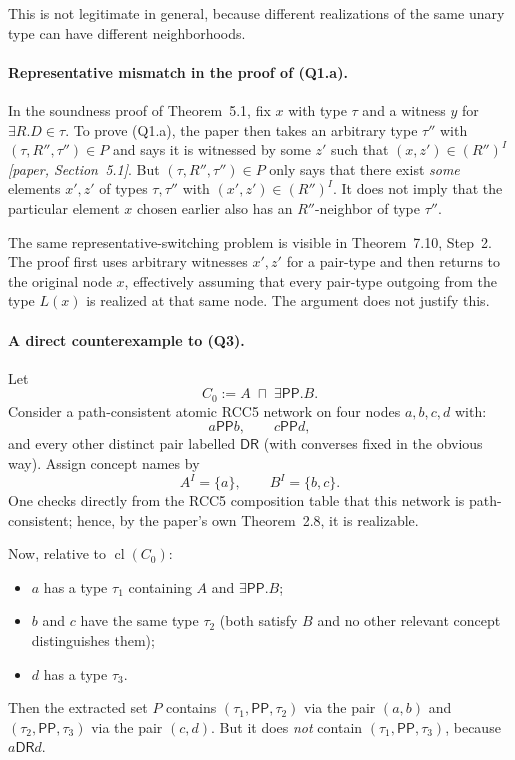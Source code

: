 \documentclass[11pt]{article}
\newcommand{\Paper}[1]{\textit{[paper, #1]}}
\newcommand{\role}[1]{\ensuremath{\mathsf{#1}}}
\newcommand{\cl}{\operatorname{cl}}
\newcommand{\PP}{\role{PP}}
\newcommand{\DR}{\role{DR}}
\begin{document}
This is not legitimate in general, because different realizations of the same unary type can have different neighborhoods.

\paragraph{Representative mismatch in the proof of (Q1.a).}
In the soundness proof of Theorem~5.1, fix $x$ with type $\tau$ and a witness $y$ for $\exists R.D \in \tau$. To prove (Q1.a), the paper then takes an arbitrary type $\tau''$ with $(\tau,R'',\tau'') \in P$ and says it is witnessed by some $z'$ such that $(x,z') \in (R'')^I$ \Paper{Section~5.1}. But $(\tau,R'',\tau'') \in P$ only says that there exist \emph{some} elements $x',z'$ of types $\tau,\tau''$ with $(x',z') \in (R'')^I$. It does not imply that the particular element $x$ chosen earlier also has an $R''$-neighbor of type $\tau''$.

The same representative-switching problem is visible in Theorem~7.10, Step~2. The proof first uses arbitrary witnesses $x',z'$ for a pair-type and then returns to the original node $x$, effectively assuming that every pair-type outgoing from the type $L(x)$ is realized at that same node. The argument does not justify this.

\paragraph{A direct counterexample to (Q3).}
Let
\[
C_0 := A \;\sqcap\; \exists \PP.B.
\]
Consider a path-consistent atomic RCC5 network on four nodes $a,b,c,d$ with:
\[
a\PP b, \qquad c\PP d,
\]
and every other distinct pair labelled $\DR$ (with converses fixed in the obvious way). Assign concept names by
\[
A^I = \{a\}, \qquad B^I = \{b,c\}.
\]
One checks directly from the RCC5 composition table that this network is path-consistent; hence, by the paper's own Theorem~2.8, it is realizable.

Now, relative to $\cl(C_0)$:
\begin{itemize}
    \item $a$ has a type $\tau_1$ containing $A$ and $\exists \PP.B$;
    \item $b$ and $c$ have the same type $\tau_2$ (both satisfy $B$ and no other relevant concept distinguishes them);
    \item $d$ has a type $\tau_3$.
\end{itemize}
Then the extracted set $P$ contains $(\tau_1,\PP,\tau_2)$ via the pair $(a,b)$ and $(\tau_2,\PP,\tau_3)$ via the pair $(c,d)$. But it does \emph{not} contain $(\tau_1,\PP,\tau_3)$, because $a\DR d$.
\end{document}
